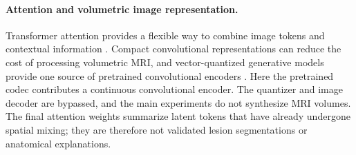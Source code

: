 \paragraph{Attention and volumetric image representation.}
Transformer attention provides a flexible way to combine image tokens and contextual information \citep{vaswani2017}. Compact convolutional representations can reduce the cost of processing volumetric MRI, and vector-quantized generative models provide one source of pretrained convolutional encoders \citep{vqgan2021}. Here the pretrained codec contributes a continuous convolutional encoder. The quantizer and image decoder are bypassed, and the main experiments do not synthesize MRI volumes. The final attention weights summarize latent tokens that have already undergone spatial mixing; they are therefore not validated lesion segmentations or anatomical explanations.
